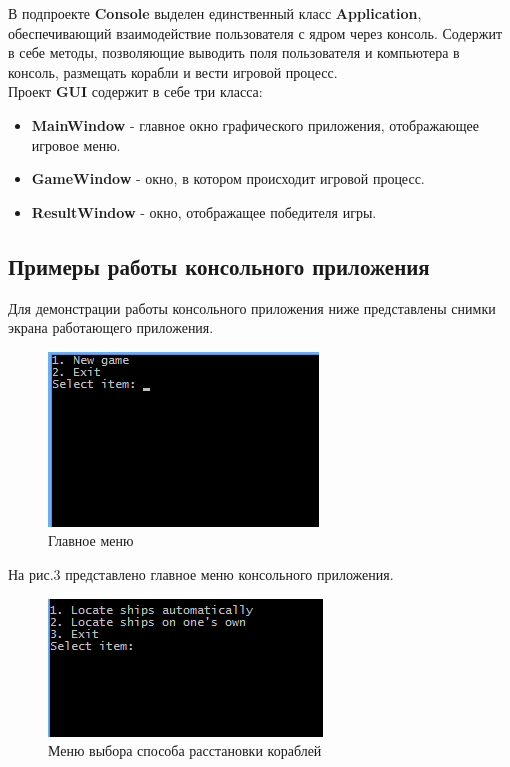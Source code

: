 \documentclass[a4paper]{article}
\begin{document}
В подпроекте \textbf{Console} выделен единственный класс \textbf{Application}, обеспечивающий взаимодействие пользователя с ядром через консоль. Содержит в себе методы, позволяющие выводить поля пользователя и компьютера в консоль, размещать корабли и вести игровой процесс.\\


Проект \textbf{GUI} содержит в себе три класса:

\begin{itemize}

\item \textbf{MainWindow} - главное окно графического приложения, отображающее игровое меню.

\item \textbf{GameWindow} - окно, в котором происходит игровой процесс.

\item \textbf{ResultWindow} - окно, отображащее победителя игры. 

\end{itemize}

\subsection{Примеры работы консольного приложения}

Для демонстрации работы консольного приложения ниже представлены снимки экрана работающего приложения.

\begin{figure}[H]
	\begin{center}
		\includegraphics[scale=0.7]{screen/console_menu.png}
		\caption{Главное меню} 
		\label{pic: console main menu} %
	\end{center}
\end{figure}

На рис.3 представлено главное меню консольного приложения. 

\begin{figure}[H]
	\begin{center}
		\includegraphics[scale=0.7]{screen/console_locate_ships_menu.png}
		\caption{Меню выбора способа расстановки кораблей} 
		\label{pic:pic_name} %
	\end{center}
\end{figure}
\end{document}
